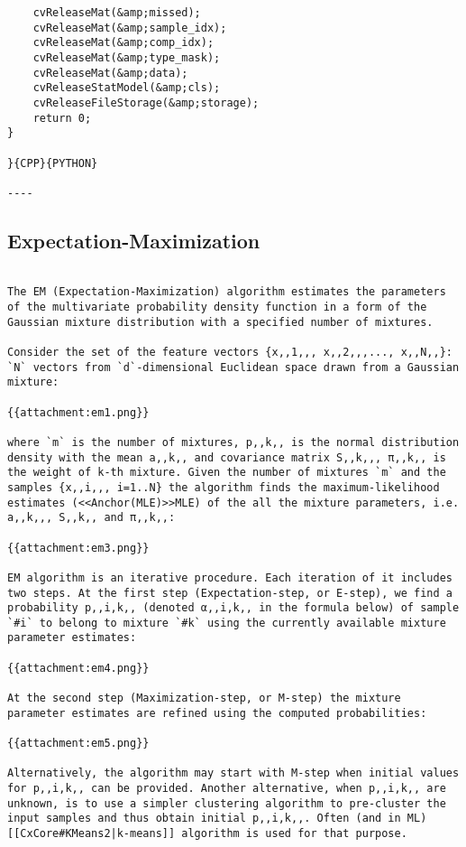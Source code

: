 \begin{verbatim}
    cvReleaseMat(&amp;missed);
    cvReleaseMat(&amp;sample_idx);
    cvReleaseMat(&amp;comp_idx);
    cvReleaseMat(&amp;type_mask);
    cvReleaseMat(&amp;data);
    cvReleaseStatModel(&amp;cls);
    cvReleaseFileStorage(&amp;storage);
    return 0;
}

}{CPP}{PYTHON}

----

\end{verbatim}
\subsection{Expectation-Maximization}
\begin{verbatim}

The EM (Expectation-Maximization) algorithm estimates the parameters of the multivariate probability density function in a form of the Gaussian mixture distribution with a specified number of mixtures.

Consider the set of the feature vectors {x,,1,,, x,,2,,,..., x,,N,,}: `N` vectors from `d`-dimensional Euclidean space drawn from a Gaussian mixture:

{{attachment:em1.png}}

where `m` is the number of mixtures, p,,k,, is the normal distribution density with the mean a,,k,, and covariance matrix S,,k,,, π,,k,, is the weight of k-th mixture. Given the number of mixtures `m` and the samples {x,,i,,, i=1..N} the algorithm finds the maximum-likelihood estimates (<<Anchor(MLE)>>MLE) of the all the mixture parameters, i.e. a,,k,,, S,,k,, and π,,k,,:

{{attachment:em3.png}}

EM algorithm is an iterative procedure. Each iteration of it includes two steps. At the first step (Expectation-step, or E-step), we find a probability p,,i,k,, (denoted α,,i,k,, in the formula below) of sample `#i` to belong to mixture `#k` using the currently available mixture parameter estimates:

{{attachment:em4.png}}

At the second step (Maximization-step, or M-step) the mixture parameter estimates are refined using the computed probabilities:

{{attachment:em5.png}}

Alternatively, the algorithm may start with M-step when initial values for p,,i,k,, can be provided. Another alternative, when p,,i,k,, are unknown, is to use a simpler clustering algorithm to pre-cluster the input samples and thus obtain initial p,,i,k,,. Often (and in ML) [[CxCore#KMeans2|k-means]] algorithm is used for that purpose.


\end{verbatim}

